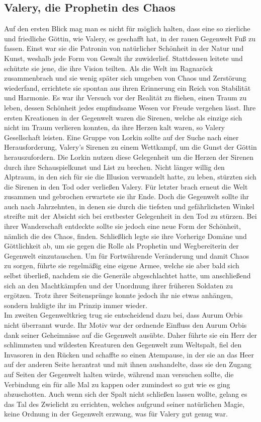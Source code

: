 \documentclass[a4paper,12pt,oneside]{book}
\begin{document}
\subsection{Valery, die Prophetin des Chaos}
Auf den ersten Blick mag man es nicht für möglich halten, dass eine so zierliche und friedliche Göttin, wie Valery, es geschafft hat, in der rauen Gegenwelt Fuß zu fassen. Einst war sie die Patronin von natürlicher Schönheit in der Natur und Kunst, weshalb jede Form von Gewalt ihr zuwiderlief. Stattdessen leitete und schützte sie jene, die ihre Vision teilten. Als die Welt im Ragnaröck zusammenbrach und sie wenig später sich umgeben von Chaos und Zerstörung wiederfand, errichtete sie spontan aus ihren Erinnerung ein Reich von Stabilität und Harmonie. Es war ihr Versuch vor der Realität zu fliehen, einen Traum zu leben, dessen Schönheit jedes empfindsame Wesen vor Freude vergehen lässt. Ihre ersten Kreationen in der Gegenwelt waren die Sirenen, welche als einzige sich nicht im Traum verlieren konnten, da ihre Herzen kalt waren, so Valery Gesellschaft leisten. Eine Gruppe von Lorkin sollte auf der Suche nach einer Herausforderung, Valery's Sirenen zu einem Wettkampf, um die Gunst der Göttin herauszufordern. Die Lorkin nutzen diese Gelegenheit um die Herzen der Sirenen durch ihre Schauspielkunst und List zu brechen. Nicht länger willig den Alptraum, in den sich für sie die Illusion verwandelt hatte, zu leben, stürzten sich die Sirenen in den Tod oder verließen Valery. Für letzter brach erneut die Welt zusammen und gebrochen erwartete sie ihr Ende. Doch die Gegenwelt sollte ihr auch nach Jahrzehnten, in denen sie durch die tiefsten und gefährlichsten Winkel streifte mit der Absicht sich bei erstbester Gelegenheit in den Tod zu stürzen. Bei ihrer Wanderschaft entdeckte sollte sie jedoch eine neue Form der Schönheit, nämlich die des Chaos, finden. Schließlich legte sie ihre Vorherige Domäne und Göttlichkeit ab, um sie gegen die Rolle als Prophetin und Wegbereiterin der Gegenwelt einzutauschen. Um für Fortwährende Veränderung und damit Chaos zu sorgen, führte sie regelmäßig eine eigene Armee, welche sie aber bald sich selbst überließ, nachdem sie die Generäle abgeschlachtet hatte, um anschließend sich an den Machtkämpfen und der Unordnung ihrer früheren Soldaten zu ergötzen. Trotz ihrer Seitensprünge konnte jedoch ihr nie etwas anhängen, sondern huldigte ihr im Prinzip immer wieder.
\\Im zweiten Gegenweltkrieg trug sie entscheidend dazu bei, dass Aurum Orbis nicht überrannt wurde. Ihr Motiv war der ordnende Einfluss den Aurum Orbis dank seiner Geheimnisse auf die Gegenwelt ausübte. Daher führte sie ein Herr der schlimmsten und wildesten Kreaturen den Gegenwelt zum Weltspalt, fiel den Invasoren in den Rücken und schaffte so einen Atempause, in der sie an das Heer auf der anderen Seite herantrat und mit ihnen aushandelte, dass sie den Zugang auf Seiten der Gegenwelt halten würde, während man versuchen sollte, die Verbindung ein für alle Mal zu kappen oder zumindest so gut wie es ging abzuschotten. Auch wenn sich der Spalt nicht schließen lassen wollte, gelang es das Tal des Zwielicht zu errichten, welches aufgrund seiner natürlichen Magie, keine Ordnung in der Gegenwelt erzwang, was für Valery gut genug war.
\end{document}
